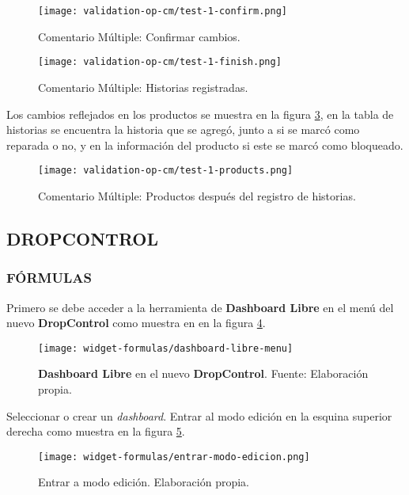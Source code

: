 \begin{figure}[H]
	\centering
	\texttt{[image: validation-op-cm/test-1-confirm.png]}
	\caption{\label{fig:op-test-1-confirm-cm} Comentario Múltiple: Confirmar cambios.}
\end{figure}

\begin{figure}[H]
	\centering
	\texttt{[image: validation-op-cm/test-1-finish.png]}
	\caption{\label{fig:op-test-1-finish-cm} Comentario Múltiple: Historias registradas.}
\end{figure}

Los cambios reflejados en los productos se muestra en la figura \ref{fig:op-test-1-products-cm}, en la tabla de historias se encuentra la historia que se agregó, junto a si se marcó como reparada o no, y en la información del producto si este se marcó como bloqueado.

\begin{figure}[H]
	\centering
	\texttt{[image: validation-op-cm/test-1-products.png]}
	\caption{\label{fig:op-test-1-products-cm} Comentario Múltiple: Productos después del registro de historias.}
\end{figure}

\subsection{DROPCONTROL}

\subsubsection{FÓRMULAS}

Primero se debe acceder a la herramienta de \textbf{Dashboard Libre} en el menú del nuevo \textbf{DropControl} como muestra en en la figura \ref{fig:dash-libre-menu}.

\begin{figure}[H]
	\centering
	\texttt{[image: widget-formulas/dashboard-libre-menu]}
	\caption{\label{fig:dash-libre-menu} \textbf{Dashboard Libre} en el nuevo \textbf{DropControl}. Fuente: Elaboración propia.}
\end{figure}

Seleccionar o crear un \textit{dashboard}. Entrar al modo edición en la esquina superior derecha como muestra en la figura \ref{fig:entrar-modo-edicion}.
\iffalse foto con paso de como entrar al modo edicion \fi
\begin{figure}[H]
	\centering
	\texttt{[image: widget-formulas/entrar-modo-edicion.png]}
	\caption{\label{fig:entrar-modo-edicion} Entrar a modo edición. Elaboración propia.}
\end{figure}

